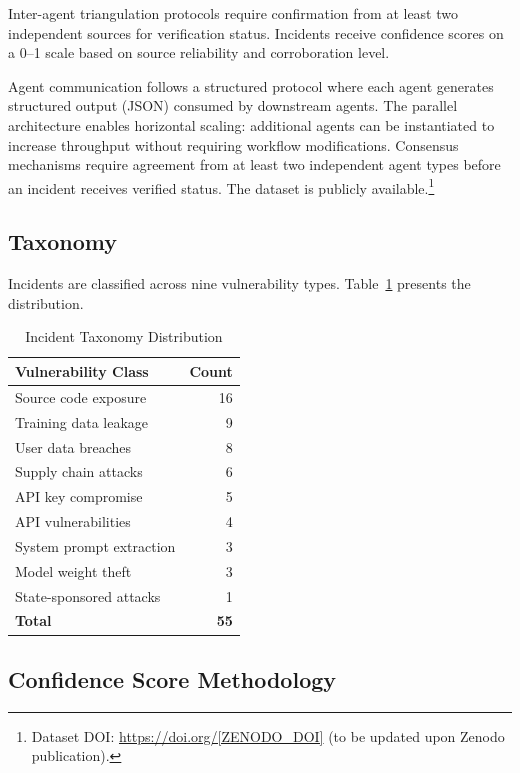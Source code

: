 \documentclass[10pt,conference]{IEEEtran}
\begin{document}
Inter-agent triangulation protocols require confirmation from at least two independent sources for verification status. Incidents receive confidence scores on a 0--1 scale based on source reliability and corroboration level.

Agent communication follows a structured protocol where each agent generates structured output (JSON) consumed by downstream agents. The parallel architecture enables horizontal scaling: additional agents can be instantiated to increase throughput without requiring workflow modifications. Consensus mechanisms require agreement from at least two independent agent types before an incident receives verified status. The dataset is publicly available.\footnote{Dataset DOI: \url{https://doi.org/[ZENODO_DOI]} (to be updated upon Zenodo publication).}

\subsection{Taxonomy}

Incidents are classified across nine vulnerability types. Table~\ref{tab:taxonomy} presents the distribution.

\begin{table}[htbp]
\caption{Incident Taxonomy Distribution}
\label{tab:taxonomy}
\centering
\begin{tabular}{lr}
\toprule
\textbf{Vulnerability Class} & \textbf{Count} \\
\midrule
Source code exposure & 16 \\
Training data leakage & 9 \\
User data breaches & 8 \\
Supply chain attacks & 6 \\
API key compromise & 5 \\
API vulnerabilities & 4 \\
System prompt extraction & 3 \\
Model weight theft & 3 \\
State-sponsored attacks & 1 \\
\midrule
\textbf{Total} & \textbf{55} \\
\bottomrule
\end{tabular}
\end{table}

\subsection{Confidence Score Methodology}
\end{document}
